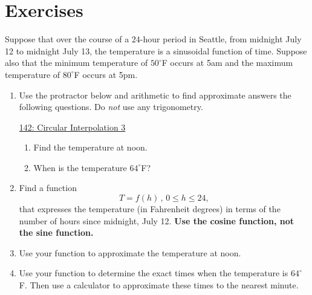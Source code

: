 \documentclass{ximera}
\begin{document}
\section{Exercises}
\begin{exercise} \label{ExPOfdgryreer}

Suppose that over the course of a $24$-hour period in Seattle, from midnight July 12 to midnight July 13, the temperature is a sinusoidal function of time. Suppose also that the minimum temperature of $50^\circ$F occurs at 5am and the maximum temperature of $80^\circ$F occurs at 5pm. 

\begin{enumerate}
\item Use the protractor below and arithmetic to find approximate answers the following questions. Do \emph{not} use any trigonometry.

\begin{onlineOnly}
    \begin{center}
\end{center}
\end{onlineOnly}

\href{https://www.desmos.com/calculator/0bywoftlld}{142: Circular Interpolation 3}

\begin{enumerate}
\item Find the temperature at noon.

\item When is the temperature $64^\circ$F?
\end{enumerate}

\item Find a function
\[
 T = f(h) \, , \, 0\leq h \leq 24,
\]
that expresses the temperature (in Fahrenheit degrees) in terms of the number of hours since midnight, July 12. {\bf Use the cosine function, not the sine function.}

\item Use your function to approximate the temperature at noon.

\item Use your function to determine the exact times when the temperature is $64^\circ$F. Then use a calculator to approximate these times to the nearest minute.

\end{enumerate}
\end{exercise}
\end{document}
